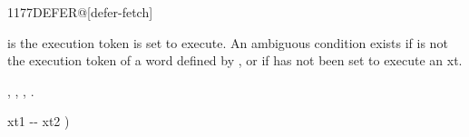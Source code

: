 \begin{worddef}{1177}{DEFER@}[defer-fetch]%
\item {}

	 is the execution token  is set to execute.
	An ambiguous condition exists if  is not
	the execution token of a word defined by ,
	or if  has not been set to execute an xt. 

\see {},
	,
	,
	.

	\begin{implement} %
		\word{:}   xt1 -{}- xt2 ) \\
		\tab {}  \word{;}
	\end{implement}

	\begin{testing} %

		 \\
		 \\

		 \\
		 \\
	\end{testing}
\end{worddef}


